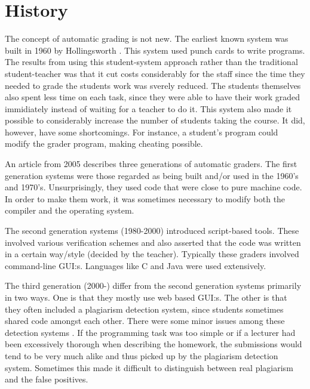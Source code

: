 \section{History}
The concept of automatic grading is not new. The earliest known system was built in 1960 by Hollingsworth \cite{Hollingsworth}. This system used punch cards to write programs. The results from using this student-system approach rather than the traditional student-teacher was that it cut costs considerably for the staff since the time they needed to grade the students work was sverely reduced. The students themselves also spent less time on each task, since they were able to have their work graded immidiately instead of waiting for a teacher to do it. This system also made it possible to considerably increase the number of students taking the course. It did, however, have some shortcomings. For instance, a student's program could modify the grader program, making cheating possible. 

An article from 2005 \cite{GenerationReview} describes three generations of automatic graders. The first generation systems were those regarded as being built and/or used in the 1960's and 1970's. Unsurprisingly, they used code that were close to pure machine code. In order to make them work, it was sometimes necessary to modify both the compiler and the operating system. 

The second generation systems (1980-2000) introduced script-based tools. These involved various verification schemes and also asserted that the code was written in a certain way/style (decided by the teacher). Typically these graders involved command-line GUI:s. Languages like C and Java were used extensively.

The third generation (2000-) differ from the second generation systems primarily in two ways. One is that they mostly use web based GUI:s. The other is that they often included a plagiarism detection system, since students sometimes shared code amongst each other. There were some minor issues among these detection systems \cite{GenerationReview} \cite{Gradebot} . If the programming task was too simple or if a lecturer had been excessively thorough when describing the homework, the submissions would tend to be very much alike and thus picked up by the plagiarism detection system. Sometimes this made it difficult to distinguish between real plagiarism and the false positives. 